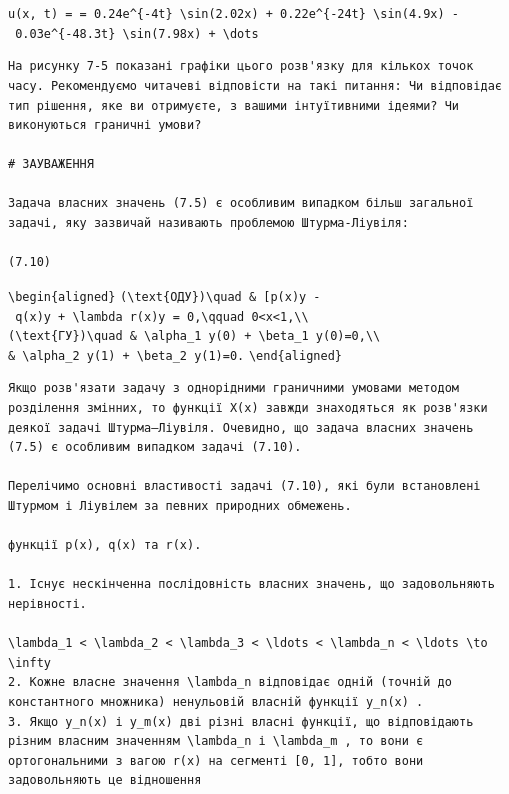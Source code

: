 \documentclass[
  ukrainian,
]{article}
\begin{document}
\texttt{u(x,\ t)\ =\ =\ 0.24e\^{}\{-4t\}\ \textbackslash{}sin(2.02x)\ +\ 0.22e\^{}\{-24t\}\ \textbackslash{}sin(4.9x)\ -\ 0.03e\^{}\{-48.3t\}\ \textbackslash{}sin(7.98x)\ +\ \textbackslash{}dots}

\begin{verbatim}
На рисунку 7-5 показані графіки цього розв'язку для кількох точок часу. Рекомендуємо читачеві відповісти на такі питання: Чи відповідає тип рішення, яке ви отримуєте, з вашими інтуїтивними ідеями? Чи виконуються граничні умови?

# ЗАУВАЖЕННЯ

Задача власних значень (7.5) є особливим випадком більш загальної задачі, яку зазвичай називають проблемою Штурма-Ліувіля:

(7.10)
\end{verbatim}

\texttt{\textbackslash{}begin\{aligned\}}
\texttt{(\textbackslash{}text\{ОДУ\})\textbackslash{}quad\ \&\ {[}p(x)y\textquotesingle{}{]}\textquotesingle{}\ -\ q(x)y\ +\ \textbackslash{}lambda\ r(x)y\ =\ 0,\textbackslash{}qquad\ 0\textless{}x\textless{}1,\textbackslash{}\textbackslash{}}
\texttt{(\textbackslash{}text\{ГУ\})\textbackslash{}quad\ \&\ \textbackslash{}alpha\_1\ y(0)\ +\ \textbackslash{}beta\_1\ y\textquotesingle{}(0)=0,\textbackslash{}\textbackslash{}}
\texttt{\&\ \textbackslash{}alpha\_2\ y(1)\ +\ \textbackslash{}beta\_2\ y\textquotesingle{}(1)=0.}
\texttt{\textbackslash{}end\{aligned\}}

\begin{verbatim}
Якщо розв'язати задачу з однорідними граничними умовами методом розділення змінних, то функції X(x) завжди знаходяться як розв'язки деякої задачі Штурма–Ліувіля. Очевидно, що задача власних значень (7.5) є особливим випадком задачі (7.10).

Перелічимо основні властивості задачі (7.10), які були встановлені Штурмом і Ліувілем за певних природних обмежень.

функції p(x), q(x) та r(x).

1. Існує нескінченна послідовність власних значень, що задовольняють нерівності.

\lambda_1 < \lambda_2 < \lambda_3 < \ldots < \lambda_n < \ldots \to \infty
2. Кожне власне значення \lambda_n відповідає одній (точній до константного множника) ненульовій власній функції y_n(x) .
3. Якщо y_n(x) і y_m(x) дві різні власні функції, що відповідають різним власним значенням \lambda_n і \lambda_m , то вони є ортогональними з вагою r(x) на сегменті [0, 1], тобто вони задовольняють це відношення
\end{verbatim}
\end{document}
